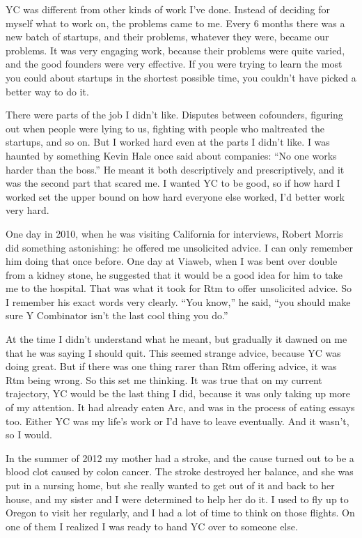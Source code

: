YC was different from other kinds of work I've done. Instead of deciding
for myself what to work on, the problems came to me. Every 6 months
there was a new batch of startups, and their problems, whatever they
were, became our problems. It was very engaging work, because their
problems were quite varied, and the good founders were very effective.
If you were trying to learn the most you could about startups in the
shortest possible time, you couldn't have picked a better way to do it.

There were parts of the job I didn't like. Disputes between cofounders,
figuring out when people were lying to us, fighting with people who
maltreated the startups, and so on. But I worked hard even at the parts
I didn't like. I was haunted by something Kevin Hale once said about
companies: ``No one works harder than the boss.'' He meant it both
descriptively and prescriptively, and it was the second part that scared
me. I wanted YC to be good, so if how hard I worked set the upper bound
on how hard everyone else worked, I'd better work very hard.

One day in 2010, when he was visiting California for interviews, Robert
Morris did something astonishing: he offered me unsolicited advice. I
can only remember him doing that once before. One day at Viaweb, when I
was bent over double from a kidney stone, he suggested that it would be
a good idea for him to take me to the hospital. That was what it took
for Rtm to offer unsolicited advice. So I remember his exact words very
clearly. ``You know,'' he said, ``you should make sure Y Combinator
isn't the last cool thing you do.''

At the time I didn't understand what he meant, but gradually it dawned
on me that he was saying I should quit. This seemed strange advice,
because YC was doing great. But if there was one thing rarer than Rtm
offering advice, it was Rtm being wrong. So this set me thinking. It was
true that on my current trajectory, YC would be the last thing I did,
because it was only taking up more of my attention. It had already eaten
Arc, and was in the process of eating essays too. Either YC was my
life's work or I'd have to leave eventually. And it wasn't, so I would.

In the summer of 2012 my mother had a stroke, and the cause turned out
to be a blood clot caused by colon cancer. The stroke destroyed her
balance, and she was put in a nursing home, but she really wanted to get
out of it and back to her house, and my sister and I were determined to
help her do it. I used to fly up to Oregon to visit her regularly, and I
had a lot of time to think on those flights. On one of them I realized I
was ready to hand YC over to someone else.

